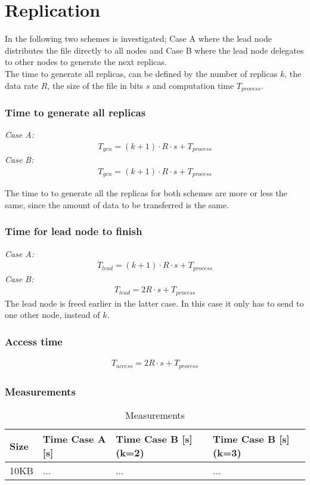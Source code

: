 \section{Replication}
In the following two schemes is investigated; Case A where the lead node distributes the file directly to all nodes and Case B where the lead node delegates to other nodes to generate the next replicas. \\
The time to generate all replicas, can be defined by the number of replicas $k$, the data rate $R$, the size of the file in bits $s$ and computation time $T_{process}$. 

\subsubsection*{Time to generate all replicas}
\textit{Case A:} 
\begin{align}
    T_{gen} = (k+1)\cdot R\cdot s + T_{process}
\end{align}
\textit{Case B:} 
\begin{align}
    T_{gen} = (k+1)\cdot R\cdot s + T_{process}
\end{align}

The time to to generate all the replicas for both schemes are more or less the same, since the amount of data to be transferred is the same. 

\subsubsection*{Time for lead node to finish}
\textit{Case A:}
\begin{align}
    T_{lead} = (k+1)\cdot R\cdot s + T_{process}
\end{align}
\textit{Case B:}
\begin{align}
    T_{lead} = 2R \cdot s + T_{process}
\end{align}
The lead node is freed earlier in the latter case. In this case it only has to send to one other node, instead of $k$.

\subsubsection*{Access time}
\begin{align}
    T_{access} = 2R \cdot s + T_{process}
\end{align}

\subsubsection*{Measurements}

\begin{table}[H]
	\centering
	\begin{tabular}{|l|l|l|l|}
		\hline
		\cellcolor{lightgray}\textbf{Size} & \cellcolor{lightgray}\textbf{Time Case A [s]} & \cellcolor{lightgray}\textbf{Time Case B [s] (k=2)} & \cellcolor{lightgray}\textbf{Time Case B [s] (k=3)} \\ \hline
		10KB & ...  & ... & ... \\ \hline
	\end{tabular}
	\caption{Measurements}
	\label{tab:e2meas}
\end{table}
